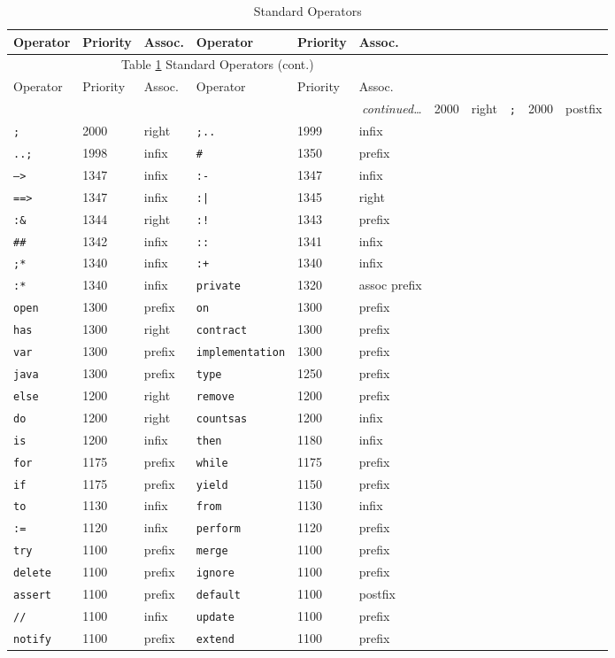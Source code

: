 \begin{longtable}{|lll|lll|}
\caption{Standard Operators}\label{StandardOps}\\ 
\hline
Operator&Priority&Assoc.&Operator&Priority&Assoc.\\
\hline
\endfirsthead
\multicolumn{6}{c}{
{Table \ref{StandardOps} Standard Operators (cont.)}}\\
\hline
Operator&Priority&Assoc.&Operator&Priority&Assoc.\\
\hline
\endhead
\hline\multicolumn{6}{r}{\small\emph{continued\ldots}}\
\endfoot
\hline
\endlastfoot
\tt |\_|&2000&right&\tt ;&2000&postfix\\
\tt ;&2000&right&\tt ;..&1999&infix\\
\tt ..;&1998&infix&\tt \#&1350&prefix\\
\tt -->&1347&infix&\tt :-&1347&infix\\
\tt ==>&1347&infix&\tt :|&1345&right\\
\tt :\&&1344&right&\tt :!&1343&prefix\\
\tt \#\#&1342&infix&\tt ::&1341&infix\\
\tt ;*&1340&infix&\tt :+&1340&infix\\
\tt :*&1340&infix&\tt private&1320&assoc prefix\\
\tt open&1300&prefix&\tt on&1300&prefix\\
\tt has&1300&right&\tt contract&1300&prefix\\
\tt var&1300&prefix&\tt implementation&1300&prefix\\
\tt java&1300&prefix&\tt type&1250&prefix\\
\tt else&1200&right&\tt remove&1200&prefix\\
\tt do&1200&right&\tt counts\spce{}as&1200&infix\\
\tt is&1200&infix&\tt then&1180&infix\\
\tt for&1175&prefix&\tt while&1175&prefix\\
\tt if&1175&prefix&\tt yield&1150&prefix\\
\tt to&1130&infix&\tt from&1130&infix\\
\tt :=&1120&infix&\tt perform&1120&prefix\\
\tt try&1100&prefix&\tt merge&1100&prefix\\
\tt delete&1100&prefix&\tt ignore&1100&prefix\\
\tt assert&1100&prefix&\tt default&1100&postfix\\
\tt //&1100&infix&\tt update&1100&prefix\\
\tt notify&1100&prefix&\tt extend&1100&prefix\\

\end{longtable}
